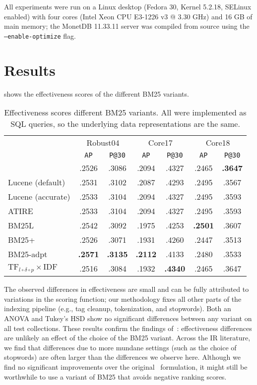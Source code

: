 All experiments were run on a Linux desktop (Fedora 30, Kernel 5.2.18, SELinux enabled) with four cores (Intel Xeon CPU E3-1226 v3 @ 3.30 GHz) and 16 GB of main memory; the MonetDB 11.33.11 server was compiled from source using the \texttt{---enable-optimize} flag.

\section{Results}
 shows the effectiveness scores of the different BM25 variants.  
\begin{table}
	\centering
	\caption{Effectiveness scores different BM25 variants. All were implemented as SQL queries, so the underlying data representations are the same.}
	\label{bm25_variant_results}
	\begin{tabular}{l c c c c c c}
		\toprule
		&\multicolumn{2}{c}{Robust04}&\multicolumn{2}{c}{Core17}&\multicolumn{2}{c}{Core18}\\
		&\texttt{AP}&\texttt{P@30}&\texttt{AP}&\texttt{P@30}&\texttt{AP}&\texttt{P@30}\\
		\midrule
		{\small \citeauthor{bm25-robertson}} & .2526 & .3086 & .2094 & .4327 & .2465 & \textbf{.3647} \\ 
		{\small Lucene (default)} & .2531 & .3102 & .2087 & .4293 & .2495 & .3567 \\ 
		{\small Lucene (accurate)} & .2533 & .3104 & .2094 & .4327 & .2495 & .3593 \\ 
		{\small ATIRE} & .2533 & .3104 & .2094 & .4327 & .2495 & .3593 \\ 
		{\small BM25L} & .2542 & .3092 & .1975 & .4253 & \textbf{.2501} & .3607 \\ 
		{\small BM25+} & .2526 & .3071 & .1931 & .4260 & .2447 & .3513 \\ 
		{\small BM25-adpt} & \textbf{.2571} & \textbf{.3135} & \textbf{.2112} & .4133 & .2480 & .3533\\ 
		{\small $\text{TF}_{l\circ\delta\circ p}\times\text{IDF}$} & .2516 & .3084 & .1932 & \textbf{.4340} & .2465 & .3647\\ 
		\bottomrule
	\end{tabular}
\end{table}
The observed differences in effectiveness are small and can be fully attributed to variations in the scoring function; our methodology fixes all other parts of the indexing pipeline (e.g., tag cleanup, tokenization, and stopwords). Both an ANOVA and Tukey’s HSD show no significant differences between any variant on all test collections. These results confirm the findings of~\citet{trotman-bm25}: effectiveness differences are unlikely an effect of the choice of the BM25 variant. Across the IR literature, we find that differences due to more mundane settings (such as the choice of stopwords) are often larger than the differences we observe here. Although we find no significant improvements over the original~\citep{bm25-robertson} formulation, it might still be worthwhile to use a variant of BM25 that avoids negative ranking scores.


